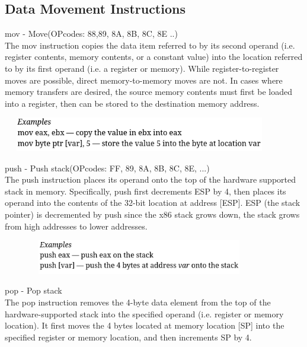 \documentclass[12pt]{extarticle}
\begin{document}
 \subsection{Data Movement Instructions}

 mov - Move(OPcodes: 88,89, 8A, 8B, 8C, 8E ..) \\

 The mov instruction copies the data item referred to by its second operand (i.e. register contents, memory contents, or a constant value) into the location referred to by its first operand (i.e. a register or memory). While register-to-register moves are possible, direct memory-to-memory moves are not. In cases where memory transfers are desired, the source memory contents must first be loaded into a register, then can be stored to the destination memory address.

 \begin{center}

    \includegraphics[width=12cm, height=1.5cm]{dec4}
    
 \end{center}

 push - Push stack(OPcodes: FF, 89, 8A, 8B, 8C, 8E, ...) \\

 The push instruction places its operand onto the top of the hardware supported stack in memory. Specifically, push first decrements ESP by 4, then places its operand into the contents of the 32-bit location at address [ESP]. ESP (the stack pointer) is decremented by push since the x86 stack grows down, the stack grows from high addresses to lower addresses. 

 \begin{center}

    \includegraphics[width=12cm, height=1.5cm]{dec5}
    
 \end{center}

 pop - Pop stack \\

 The pop instruction removes the 4-byte data element from the top of the hardware-supported stack into the specified operand (i.e. register or memory location). It first moves the 4 bytes located at memory location [SP] into the specified register or memory location, and then increments SP by 4. 
\end{document}
